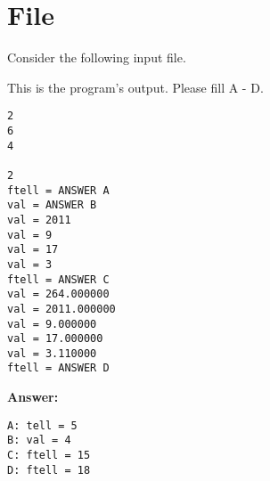 \newpage
\section{File} 

Consider the following input file.


\resetlinenumber[1]
\begin{tt}
  
\end{tt}


\resetlinenumber[1]
\linenumbers
\begin{tt}
  
\end{tt}
\nolinenumbers

This is the program's output. Please fill A - D.


\begin{verbatim}
2
6
4
 
2
ftell = ANSWER A
val = ANSWER B
val = 2011
val = 9
val = 17
val = 3
ftell = ANSWER C
val = 264.000000
val = 2011.000000
val = 9.000000
val = 17.000000
val = 3.110000
ftell = ANSWER D
\end{verbatim}


\ifexam


\else


{\bf Answer:}
\begin{verbatim}
A: tell = 5
B: val = 4
C: ftell = 15
D: ftell = 18
\end{verbatim}
\fi
